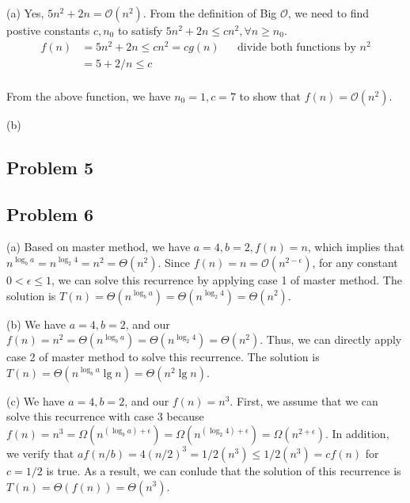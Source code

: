 \documentclass[a4paper]{article}
\makeatletter
\newenvironment{solution}
  {\begin{proof}[Solution]}
  {\end{proof}}
\renewenvironment{proof}[1][\proofname]{%
  \par\pushQED{\qed}\normalfont%
  \topsep6\p@\@plus6\p@\relax
  \trivlist\item[\hskip\labelsep\bfseries#1\@addpunct{.}]%
  \ignorespaces
}{%
  \popQED\endtrivlist\@endpefalse
}
\makeatother
\begin{document}
\begin{solution}
  (a) Yes, $5n^2 + 2n = \mathcal{O}(n^2)$. From the definition of Big $\mathcal{O}$, we need to find postive constants $c, n_0$ to satisfy $5n^2 + 2n \le cn^2, \forall n \ge n_0$.
  \begin{align*}
    f(n) &= 5n^2 + 2n \le cn^ 2 = cg(n) && \text{divide both functions by $n^2$}\\
        &= 5 + 2/n \le c \\
  \end{align*}

  From the above function, we have $n_0 = 1, c = 7$ to show that $f(n) = \mathcal{O}(n^2)$.
\end{solution}

\begin{solution}
  (b)
\end{solution}

\subsection*{Problem 5}

\subsection*{Problem 6}

\begin{solution}
  (a) Based on master method, we have $a = 4, b = 2, f(n) = n$, which implies that $n^{\log_{b}a} = n^{\log_{2}4} = n^2 = \Theta(n^2)$. Since $f(n) = n = \mathcal{O}(n^{2-\epsilon})$, for any constant $0 < \epsilon \le 1$, we can solve this recurrence by applying case 1 of master method. The solution is $T(n) = \Theta(n^{\log_{b}a}) = \Theta(n^{\log_{2}4}) = \Theta(n^2)$.
\end{solution}

\begin{solution}
  (b) We have $a = 4, b = 2$, and our $f(n) = n^2 = \Theta(n^{\log_{b}a}) = \Theta(n^{\log_{2}4}) = \Theta(n^2)$. Thus, we can directly apply case 2 of master method to solve this recurrence. The solution is $T(n) = \Theta(n^{\log_{b}a}\lg n) = \Theta(n^2\lg n)$.
\end{solution}

\begin{solution}
  (c) We have $a = 4, b = 2$, and our $f(n) = n^3$. First, we assume that we can solve this recurrence with case 3 because $f(n) = n^3 = \Omega(n^{(\log_{b}a) + \epsilon}) = \Omega(n^{(\log_{2}4) + \epsilon}) = \Omega(n^{2 + \epsilon})$. In addition, we verify that $af(n/b) = 4(n/2)^3 = 1/2(n^3) \le 1/2(n^3) = cf(n)$ for $c = 1/2$ is true. As a result, we can conlude that the solution of this recurrence is $T(n) = \Theta(f(n)) = \Theta(n^3)$.
\end{solution}
\end{document}
